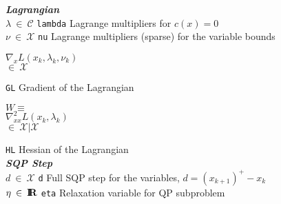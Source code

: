 {\begin{tabbing}
\textbf{\textit{Lagrangian}} \\
$\lambda \:\in\: \mathcal{C}$
	\> \texttt{lambda}
		\> Lagrange multipliers for $c(x)=0$  \\
$\nu \:\in\: \mathcal{X}$
	\> \texttt{nu}
		\> Lagrange multipliers (sparse) for the variable bounds  \\
\begin{minipage}[t]{1.0in}
$\nabla_x L(x_k,\lambda_k,\nu_k)$ \\
\hspace*{6ex}$\in\:\mathcal{X}$\\
\end{minipage}
	\> \texttt{GL}
		\> Gradient of the Lagrangian \\
\begin{minipage}[t]{25ex}
$W \equiv$ \\
$\nabla_{xx}^2 L(x_k,\lambda_k)$ \\
\hspace*{6ex}$\in\:\mathcal{X}|\mathcal{X}$
\end{minipage}
	\> \texttt{HL}
		\> Hessian of the Lagrangian \\

\textbf{\textit{SQP Step}} \\
$d \:\in\: \mathcal{X}$
	\> \texttt{d}
		\> Full SQP step for the variables, $d = (x_{k+1})^{+} - x_{k}$ \\
$\eta \:\in\: \mbox{\textbf{I}}\hspace{-0.6ex}\mbox{\textbf{R}}$
	\> \texttt{eta}
		\> Relaxation variable for QP subproblem \\


\end{tabbing}}
